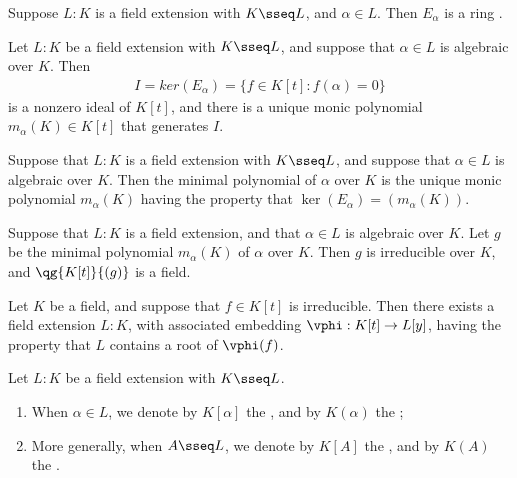 \documentclass{article}
\begin{document}
  \begin{tproposition}
    Suppose \( L: K \) is a field extension with \( K \sseq L \), and \( \alpha\in L \).
     Then \( E_\alpha \) is a ring \homo.
  \end{tproposition}

  \begin{tproposition}
    Let \( L : K \) be a field extension with \( K \sseq L \), and suppose that \( \alpha\in L \) is algebraic over \( K \).
    Then \begin{align*}
      I = ker(E_\alpha) = \{f \in K[t] : f(\alpha) = 0\}
    \end{align*}
    is a nonzero ideal of \( K[t] \), and there is a unique monic polynomial \( m_\alpha(K) \in K[t] \) that generates \( I \).
  \end{tproposition}

  \begin{tdefinition}
    Suppose that \( L : K \) is a field extension with \( K \sseq L \), and suppose that \( \alpha\in L \) is algebraic over \( K \).
    Then the minimal polynomial of \( \alpha \) over \( K \) is the unique monic polynomial \( m_\alpha(K) \) having the property that \( \ker(E_\alpha) = (m_\alpha(K)) \).
  \end{tdefinition}

  \begin{ttheorem}
    Suppose that \( L : K \) is a field extension, and that \( \alpha\in L \) is algebraic over \( K \).
    Let \( g \) be the minimal polynomial \( m_\alpha(K) \) of \( \alpha \) over \( K \).
    Then \( g \) is irreducible over \( K \), and \( \qg{K[t]}{(g)} \) is a field.
  \end{ttheorem}

  \begin{ttheorem}
    Let \( K \) be a field, and suppose that \( f\in K[t] \) is irreducible.
    Then there exists a field extension \( L:K \), with associated embedding \( \vphi:K[t]\to L[y] \), having the property that \( L \) contains a root of \( \vphi(f) \).
  \end{ttheorem}

  \begin{tdefinition}
    Let \( L:K \) be a field extension with \( K\sseq L \).
    \begin{enumerate}[label=(\roman*)]
      \item When \( \alpha\in L \), we denote by \( K[\alpha] \) the , and by \( K(\alpha) \) the ;
      \item More generally, when \( A\sseq L \), we denote by \( K[A] \) the , and by \( K(A) \) the .
    \end{enumerate}
  \end{tdefinition}
\end{document}
